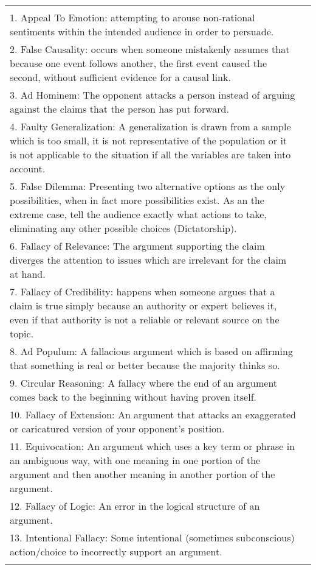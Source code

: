 \begin{table}[H]
\begin{tabular}{|m{}|m{}|}
{            The possible fallacy types are: \\
            1. Appeal To Emotion: attempting to arouse non-rational sentiments within the intended audience in order to persuade. \\
            2. False Causality: occurs when someone mistakenly assumes that because one event follows another, the first event caused the second, without sufficient evidence for a causal link. \\
            3. Ad Hominem: The opponent attacks a person instead of arguing against the claims that the person has put forward. \\
            4. Faulty Generalization: A generalization is drawn from a sample which is too small, it is not representative of the population or it is not applicable to the situation if all the variables are taken into account. \\
            5. False Dilemma: Presenting two alternative options as the only possibilities, when in fact more possibilities exist. As an the extreme case, tell the audience exactly what actions to take, eliminating any other possible choices (Dictatorship). \\
            6. Fallacy of Relevance: The argument supporting the claim diverges the attention to issues which are irrelevant for the claim at hand. \\
            7. Fallacy of Credibility: happens when someone argues that a claim is true simply because an authority or expert believes it, even if that authority is not a reliable or relevant source on the topic. \\
            8. Ad Populum: A fallacious argument which is based on affirming that something is real or better because the majority thinks so. \\
            9. Circular Reasoning: A fallacy where the end of an argument comes back to the beginning without having proven itself. \\
            10. Fallacy of Extension: An argument that attacks an exaggerated or caricatured version of your opponent’s position. \\
            11. Equivocation: An argument which uses a key term or phrase in an ambiguous way, with one meaning in one portion of the argument and then another meaning in another portion of the argument. \\
            12. Fallacy of Logic: An error in the logical structure of an argument. \\
            13. Intentional Fallacy: Some intentional (sometimes subconscious) action/choice to incorrectly support an argument. \\

}
\end{tabular}
\end{table}
